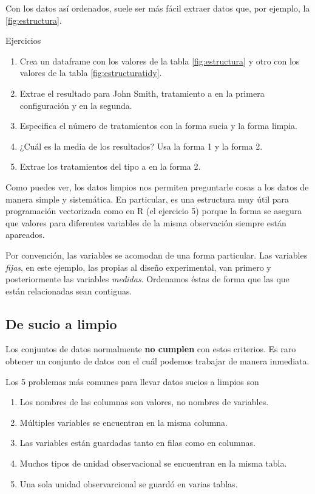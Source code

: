 \documentclass[]{article}
\providecommand{\tightlist}{%
  \setlength{\itemsep}{0pt}\setlength{\parskip}{0pt}}
\begin{document}
Con los datos así ordenados, suele ser más fácil extraer datos que, por
ejemplo, la \ref{fig:estructura}.

\renewcommand\bcStyleTitre[1]{\large\textcolor{bbblack}{#1}}

\begin{bclogo}[
  couleur=llred,
  arrondi=0,
  logo=\bcstop,
  barre=none,
  noborder=true]{Ejercicios}
\begin{enumerate}
\item Crea un dataframe con los valores de la tabla \ref{fig:estructura} y otro 
con los valores de la tabla \ref{fig:estructuratidy}.
\item Extrae el resultado para John Smith, tratamiento a en la primera configuración y en la segunda.
\item Especifica el número de tratamientos con la forma sucia y la forma limpia.
\item ¿Cuál es la media de los resultados? Usa la forma 1 y la forma 2.
\item Extrae los tratamientos del tipo a en la forma 2.
\end{enumerate}

\end{bclogo}

Como puedes ver, los datos limpios nos permiten preguntarle cosas a los
datos de manera simple y sistemática. En particular, es una estructura
muy útil para programación vectorizada como en R (el ejercicio 5) porque
la forma se asegura que valores para diferentes variables de la misma
observación siempre están apareados.

Por convención, las variables se acomodan de una forma particular. Las
variables \emph{fijas}, en este ejemplo, las propias al diseño
experimental, van primero y posteriormente las variables \emph{medidas}.
Ordenamos éstas de forma que las que están relacionadas sean contiguas.

\subsection{De sucio a limpio}\label{de-sucio-a-limpio}

Los conjuntos de datos normalmente \textbf{no cumplen} con estos
criterios. Es raro obtener un conjunto de datos con el cuál podemos
trabajar de manera inmediata.

Los 5 problemas más comunes para llevar datos sucios a limpios son

\begin{enumerate}
\def\labelenumi{\arabic{enumi}.}
\tightlist
\item
  Los nombres de las columnas son valores, no nombres de variables.
\item
  Múltiples variables se encuentran en la misma columna.
\item
  Las variables están guardadas tanto en filas como en columnas.
\item
  Muchos tipos de unidad observacional se encuentran en la misma tabla.
\item
  Una sola unidad observarcional se guardó en varias tablas.
\end{enumerate}
\end{document}

